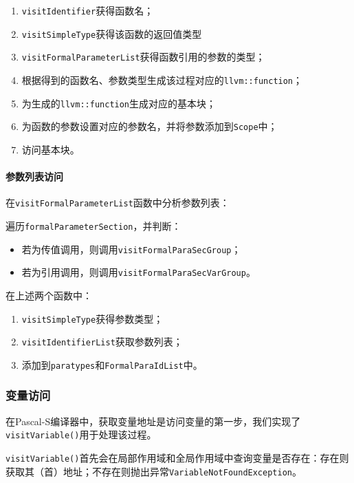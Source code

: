 \documentclass[lang=cn,11pt,a4paper,cite=authornum]{paper}
\begin{document}
\begin{enumerate}
    \item \texttt{visitIdentifier}获得函数名；
    \item \texttt{visitSimpleType}获得该函数的返回值类型
    \item \texttt{visitFormalParameterList}获得函数引用的参数的类型；
    \item 根据得到的函数名、参数类型生成该过程对应的\texttt{llvm::function}；
    \item 为生成的\texttt{llvm::function}生成对应的基本块；
    \item 为函数的参数设置对应的参数名，并将参数添加到\texttt{Scope}中；
    \item 访问基本块。 
\end{enumerate}

\paragraph{参数列表访问} 在\texttt{visitFormalParameterList}函数中分析参数列表：

遍历\texttt{formalParameterSection}，并判断：

\begin{itemize}
    \item 若为传值调用，则调用\texttt{visitFormalParaSecGroup}；
    \item 若为引用调用，则调用\texttt{visitFormalParaSecVarGroup}。
\end{itemize}

在上述两个函数中：

\begin{enumerate}
    \item \texttt{visitSimpleType}获得参数类型；
    \item \texttt{visitIdentifierList}获取参数列表；
    \item 添加到\texttt{paratypes}和\texttt{FormalParaIdList}中。
\end{enumerate}

\subsubsection{变量访问}

在Pascal-S编译器中，获取变量地址是访问变量的第一步，我们实现了\texttt{visitVariable()}用于处理该过程。

\texttt{visitVariable()}首先会在局部作用域和全局作用域中查询变量是否存在：存在则获取其（首）地址；不存在则抛出异常\texttt{VariableNotFoundException}。
\end{document}
